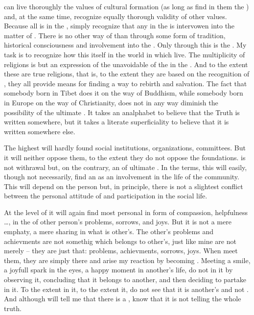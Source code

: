 { can live thoroughly the values of  cultural 
formation (as long as  find in them the ) and, at the same time, recognize equally thorough 
validity of other values. Because all 
 is  in the ,  simply 
recognize that any  in the  is 
intervowen into the matter of . There is no other way 
of  than through some form of tradition, historical 
consciousness and involvement into the . Only through this 
 is the  . My task is to 
recognize how this   itself in the world in 
which  live. The multiplicity of religions is but an expression 
of the unavoidable  of the  in the 
. And 
to the extent these are true religions, that is, to the extent 
they are based on the recognition of , they all provide means for finding a way to rebirth and 
salvation. The fact that somebody born in Tibet does it on the way of 
Buddhism, while somebody born in Europe on the way of Christianity, 
does not in any way diminish the possibility of the ultimate .
It takes an analphabet to believe that the Truth is written 
somewhere, but it takes a literate superficiality to believe that it 
is written somewhere else.


\pa\act
The highest  will hardly found social
institutions, organizations, committees.  But it will neither oppose
them, to the extent they do not oppose the  foundations. 
 is not withrawal but, on the contrary, an
 of ultimate .  In the 
terms, this  will easily, though not necessarily,
find an  as an involvement in the life of the
community.  This will depend on the person but, in principle, there is
not a slightest conflict between the personal attitude of
 and participation in the social life.

At the level of  it will again find most personal
 in form of compassion, helpfulness \ldots, in the
  of other person's problems, sorrows, and
joys.  But it is not a mere emphaty, a mere sharing in what is
other's.  The other's problems and achievments are not somethig which
belongs to other's, just like mine are not merely  -- they
are just that: problems, achievments, sorrows, joys. When 
meet them, they are simply there and arise my reaction by becoming
.  Meeting a smile, a joyfull spark in the eyes, a happy
moment in another's life,  do not  in it by observing it,
concluding that it belongs to another, and then deciding to
partake in it.  To the extent   in it, to
the extent   it,  do not see that it is
another's and not .  And although  will
tell me that there is a ,  know that it is
not telling the whole truth.


}
